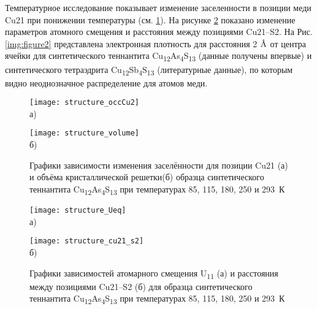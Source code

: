 Температурное исследование показывает изменение  заселенности в позиции меди Cu21 при понижении температуры (см. \ref{img:structure1}). На рисунке \ref{img:structure2} показано изменение  параметров атомного смещения и расстояния между позициями Cu21--S2.
На Рис. \ref{img:figure2} представлена электронная плотность для расстояния 2 $\mbox{\normalfont\AA}$ от центра ячейки для синтетического теннантита Cu\textsubscript{12}As\textsubscript{4}S\textsubscript{13} (данные получены впервые) и синтетического тетраэдрита Cu\textsubscript{12}Sb\textsubscript{4}S\textsubscript{13} (литературные данные), по которым видно неоднозначное распределение для атомов меди.

\begin{figure}[p!]
  \begin{minipage}[ht]{0.9\linewidth}\centering
    \texttt{[image: structure\_occCu2]} \\ а)
  \end{minipage}
  \vfill
  \begin{minipage}[ht]{0.9\linewidth}\centering
    \texttt{[image: structure\_volume]} \\ б)
  \end{minipage}

      \caption[Графики зависимости изменения заселённости для позиции Cu21(а) и объёма кристаллической решетки (б) образца синтетического теннантита Cu\textsubscript{12}As\textsubscript{4}S\textsubscript{13} при температурах 85, 115, 180, 250 и 293~К]{Графики зависимости изменения заселённости для позиции Cu21 (а) и объёма кристаллической решетки(б) образца синтетического теннантита Cu\textsubscript{12}As\textsubscript{4}S\textsubscript{13} при температурах 85, 115, 180, 250 и 293~К}
    \label{img:structure1}
\end{figure}

\begin{figure}[p!]
  \begin{minipage}[ht]{0.9\linewidth}\centering
    \texttt{[image: structure\_Ueq]} \\ а)
  \end{minipage}
  \vfill
  \begin{minipage}[ht]{0.9\linewidth}\centering
    \texttt{[image: structure\_cu21\_s2]} \\ б)
  \end{minipage}

      \caption[Графики зависимостей атомарного смещения U\textsubscript{11} (а) и расстояния между позициями Cu21--S2 (б) для образца синтетического теннантита Cu\textsubscript{12}As\textsubscript{4}S\textsubscript{13} при температурах 85, 115, 180, 250 и 293~К]{Графики зависимостей атомарного смещения U\textsubscript{11} (а) и расстояния между позициями Cu21--S2 (б) для образца синтетического теннантита Cu\textsubscript{12}As\textsubscript{4}S\textsubscript{13} при температурах 85, 115, 180, 250 и 293~К}
    \label{img:structure2}
\end{figure}
\newpage

